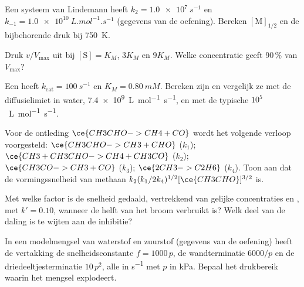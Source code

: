 \begin{exercise}[$\star$]\label{exo:b3:complex-kinetics:2}
Een systeem van Lindemann heeft $k_2 = \qty{1.0e7}{s^{-1}}$ en $k_{-1} = \qty{1.0e10}{L.mol^{-1}.s^{-1}}$ (gegevens van de
oefening). Bereken $[\mathrm M]_{1/2}$ en de bijbehorende druk bij \qty{750}{K}.
\end{exercise}

\begin{exercise}[$\star$]\label{exo:b3:complex-kinetics:3}
Druk $v/V_{\max}$ uit bij $[\mathrm S] = K_M$, $3K_M$ en $9K_M$. Welke
concentratie geeft 90\,\% van
$V_{\max}$?
\end{exercise}

\begin{exercise}[$\star$]\label{exo:b3:complex-kinetics:4}
Een  heeft $k_{\mathrm{cat}} = \qty{100}{s^{-1}}$ en $K_M = \qty{0.80}{mM}$. Bereken zijn
 en vergelijk ze met de diffusielimiet in water,
\qty{7.4e9}{L.mol^{-1}.s^{-1}}, en met de typische $10^5$~\unit{L.mol^{-1}.s^{-1}}.
\end{exercise}

\begin{exercise}[$\star\star$]\label{exo:b3:complex-kinetics:5}
Voor de ontleding $\ce{CH3CHO -> CH4 + CO}$ wordt het volgende verloop
voorgesteld: $\ce{CH3CHO -> CH3 +
CHO}$ ($k_1$); $\ce{CH3 + CH3CHO -> CH4 + CH3CO}$ ($k_2$); $\ce{CH3CO -> CH3 + CO}$ ($k_3$);
$\ce{2 CH3 -> C2H6}$ ($k_4$). Toon aan dat de vormingssnelheid van methaan
$k_2(k_1/2k_4)^{1/2}[\ce{CH3CHO}]^{3/2}$ is.
\end{exercise}

\begin{exercise}[$\star\star$]\label{exo:b3:complex-kinetics:6}
Met welke factor is de snelheid gedaald, vertrekkend van gelijke
concentraties  en , met $k' = 0.10$, wanneer de helft van
het broom verbruikt is? Welk deel van de daling is te wijten aan de
inhibitie?
\end{exercise}

\begin{exercise}[$\star\star$]\label{exo:b3:complex-kinetics:7}
In een modelmengsel van waterstof en zuurstof (gegevens van de oefening)
heeft de vertakking de snelheidsconstante $f = 1000\,p$, de
wandterminatie $6000/p$ en de driedeeltjesterminatie
$10\,p^2$, alle in \unit{s^{-1}} met $p$ in kPa. Bepaal het drukbereik
waarin het mengsel explodeert.
\end{exercise}

